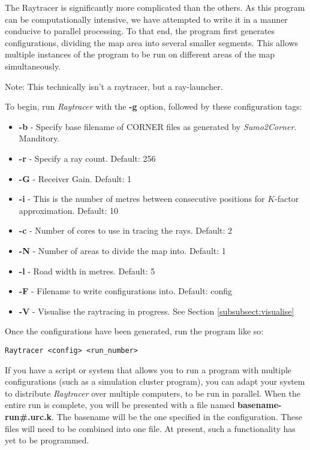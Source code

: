 The Raytracer is significantly more complicated than the others. As this program can be computationally intensive, we have attempted to write it in a manner conducive to parallel processing. To that end, the program first generates configurations, dividing the map area into several smaller segments. This allows multiple instances of the program to be run on different areas of the map simultaneously.

Note: This technically isn't a raytracer, but a ray-launcher. 

To begin, run \textit{Raytracer} with the \textbf{-g} option, followed by these configuration tags:
\begin{itemize}
 \item \textbf{-b} - Specify base filename of CORNER files as generated by \textit{Sumo2Corner}. Manditory.
 \item \textbf{-r} - Specify a ray count. Default: 256
 \item \textbf{-G} - Receiver Gain. Default: 1
 \item \textbf{-i} - This is the number of metres between consecutive positions for $K$-factor approximation. Default: 10
 \item \textbf{-c} - Number of cores to use in tracing the rays. Default: 2
 \item \textbf{-N} - Number of areas to divide the map into. Default: 1
 \item \textbf{-l} - Road width in metres. Default: 5
 \item \textbf{-F} - Filename to write configurations into. Default: config
 \item \textbf{-V} - Visualise the raytracing in progress. See Section \ref{subsubsect:visualise}
\end{itemize}

Once the configurations have been generated, run the program like so:
\begin{lstlisting}[frame=single]
 Raytracer <config> <run_number>
\end{lstlisting}

If you have a script or system that allows you to run a program with multiple configurations (such as a simulation cluster program), you can adapt your system to distribute \textit{Raytracer} over multiple computers, to be run in parallel. When the entire run is complete, you will be presented with a file named \textbf{basename-run\#.urc.k}. The basename will be the one specified in the configuration. These files will need to be combined into one file. At present, such a functionality has yet to be programmed.

